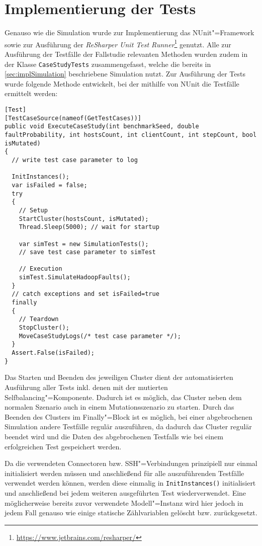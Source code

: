 \section{Implementierung der Tests}
\label{sec:implTestcases}

Genauso wie die Simulation wurde zur Implementierung das NUnit"=Framework sowie zur Ausführung der \emph{ReSharper Unit Test Runner}\footnote{\url{https://www.jetbrains.com/resharper/}} genutzt.
Alle zur Ausführung der Testfälle der Fallstudie relevanten Methoden wurden zudem in der Klasse \texttt{CaseStudyTests} zusammengefasst, welche die bereits in \cref{sec:implSimulation} beschriebene Simulation nutzt.
Zur Ausführung der Tests wurde folgende Methode entwickelt, bei der mithilfe von NUnit die Testfälle ermittelt werden:

\begin{lstlisting}[label=lst:executeTestCases,style=cs,
caption={[Methode zur Ausführung der Testfälle]
    Methode zur Ausführung der Testfälle (gekürzt)}]
[Test]
[TestCaseSource(nameof(GetTestCases))]
public void ExecuteCaseStudy(int benchmarkSeed, double faultProbability, int hostsCount, int clientCount, int stepCount, bool isMutated)
{
  // write test case parameter to log
  
  InitInstances();
  var isFailed = false;
  try
  {
    // Setup
    StartCluster(hostsCount, isMutated);
    Thread.Sleep(5000); // wait for startup
    
    var simTest = new SimulationTests();
    // save test case parameter to simTest
    
    // Execution
    simTest.SimulateHadoopFaults();
  }
  // catch exceptions and set isFailed=true
  finally
  {
    // Teardown
    StopCluster();
    MoveCaseStudyLogs(/* test case parameter */);
  }
  Assert.False(isFailed);
}
\end{lstlisting}

Das Starten und Beenden des jeweiligen Cluster dient der automatisierten Ausführung aller Tests inkl. denen mit der mutierten Selfbalancing"=Komponente.
Dadurch ist es möglich, das Cluster neben dem normalen Szenario auch in einem Mutationsszenario zu starten.
Durch das Beenden des Clusters im Finally"=Block ist es möglich, bei einer abgebrochenen Simulation andere Testfälle regulär auszuführen, da dadurch das Cluster regulär beendet wird und die Daten des abgebrochenen Testfalls wie bei einem erfolgreichen Test gespeichert werden.

Da die verwendeten Connectoren bzw. SSH"=Verbindungen prinzipiell nur einmal initialisiert werden müssen und anschließend für alle auszuführenden Testfälle verwendet werden können, werden diese einmalig in \texttt{InitInstances()} initialisiert und anschließend bei jedem weiteren ausgeführten Test wiederverwendet.
Eine möglicherweise bereits zuvor verwendete Modell"=Instanz wird hier jedoch in jedem Fall genauso wie einige statische Zählvariablen gelöscht bzw. zurückgesetzt.

